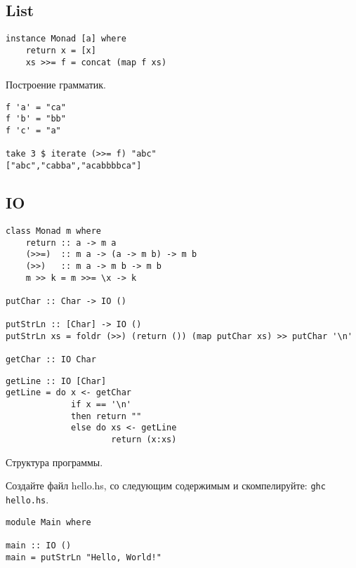 \documentclass[a4paper,10pt]{article}
\begin{document}
\subsection{List}
\begin{lstlisting}
instance Monad [a] where
    return x = [x]
    xs >>= f = concat (map f xs)
\end{lstlisting}

Построение грамматик.
\begin{lstlisting}
f 'a' = "ca"
f 'b' = "bb"
f 'c' = "a"

take 3 $ iterate (>>= f) "abc"
["abc","cabba","acabbbbca"]
\end{lstlisting}

\subsection{IO}
\begin{lstlisting}
class Monad m where
    return :: a -> m a
    (>>=)  :: m a -> (a -> m b) -> m b
    (>>)   :: m a -> m b -> m b
    m >> k = m >>= \x -> k

putChar :: Char -> IO ()

putStrLn :: [Char] -> IO ()
putStrLn xs = foldr (>>) (return ()) (map putChar xs) >> putChar '\n'

getChar :: IO Char
\end{lstlisting}

\clearpage

\begin{lstlisting}
getLine :: IO [Char]
getLine = do x <- getChar
             if x == '\n'
             then return ""
             else do xs <- getLine
                     return (x:xs)
\end{lstlisting}

Структура программы.

Создайте файл hello.hs, со следующим содержимым и скомпелируйте: {\tt ghc hello.hs}.
\begin{lstlisting}
module Main where

main :: IO ()
main = putStrLn "Hello, World!"
\end{lstlisting}
\end{document}

